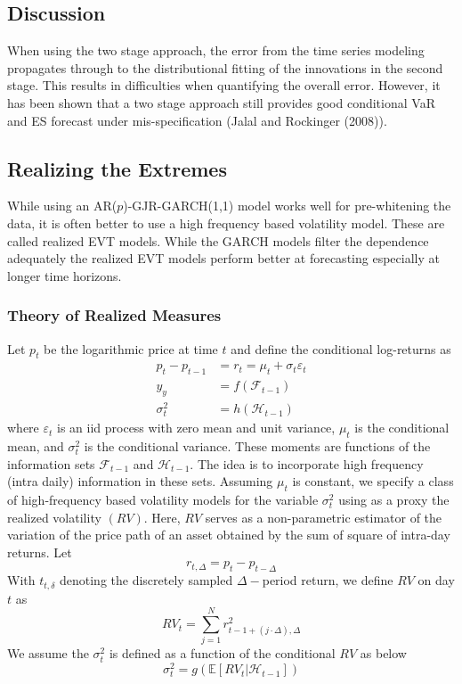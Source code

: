\documentclass{article}
\theoremstyle{definition}
\theoremstyle{definition}
\def\E{\mathbb{E}}
\def\f{\mathcal{F}}
\begin{document}
\subsection{Discussion}
When using the two stage approach, the error from the time series modeling propagates through to the distributional fitting of the innovations in the second stage. This results in difficulties when quantifying the overall error. However, it has been shown that a two stage approach still provides good conditional VaR and ES forecast under mis-specification (Jalal and Rockinger (2008)).

\subsection{Realizing the Extremes}
While using an AR($p$)-GJR-GARCH(1,1) model works well for pre-whitening the data, it is often better to use a high frequency based volatility model. These are called realized EVT models. While the GARCH models filter the dependence adequately the realized EVT models perform better at forecasting especially at longer time horizons. 
\subsubsection{Theory of Realized Measures}
Let $p_t$ be the logarithmic price at time $t$ and define the conditional log-returns as
\begin{align*}
    p_t-p_{t-1}&=r_t=\mu_t+\sigma_t\varepsilon_t\\
    y_y&=f(\f_{t-1})\\
    \sigma_t^2&=h(\mathcal{H}_{t-1})
\end{align*}
where $\varepsilon_t$ is an iid process with zero mean and unit variance, $\mu_t$ is the conditional mean, and $\sigma_t^2$ is the conditional variance. These moments are functions of the information sets $\f_{t-1}$ and $\mathcal{H}_{t-1}$. The idea is to incorporate high frequency (intra daily) information in these sets. Assuming $\mu_t$ is constant, we specify a class of high-frequency based volatility models for the variable $\sigma_t^2$ using as a proxy the realized volatility $(RV)$. Here, $RV$ serves as a non-parametric estimator of the variation of the price path of an asset obtained by the sum of square of intra-day returns. Let 
\[r_{t,\Delta}= p_t-p_{t-\Delta}\]
With $t_{t,\delta}$ denoting the discretely sampled $\Delta-$period return, we define $RV$ on day $t$ as 
\[RV_t= \sum_{j=1}^Nr^2_{t-1+(j\cdot \Delta),\Delta}\]
We assume the $\sigma_t^2$ is defined as a function of the conditional $RV$ as below
\[\sigma_t^2=g(\E[RV_t|\mathcal{H}_{t-1}])\]
\end{document}
